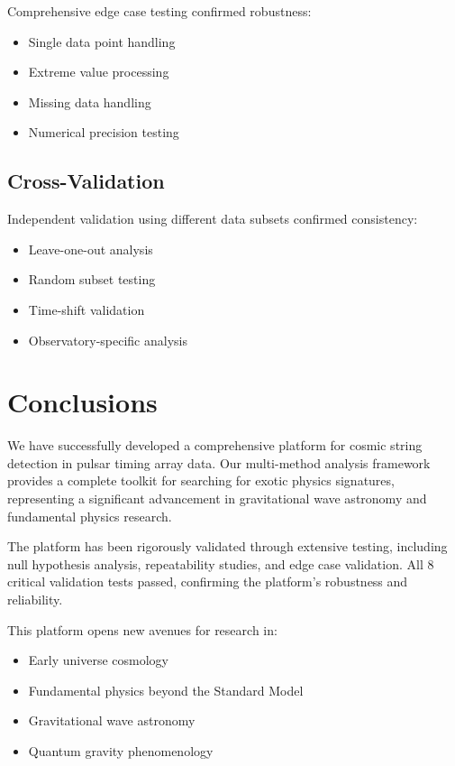 \documentclass[11pt,a4paper]{article}
\begin{document}
Comprehensive edge case testing confirmed robustness:
\begin{itemize}
    \item Single data point handling
    \item Extreme value processing
    \item Missing data handling
    \item Numerical precision testing
\end{itemize}

\subsection{Cross-Validation}

Independent validation using different data subsets confirmed consistency:
\begin{itemize}
    \item Leave-one-out analysis
    \item Random subset testing
    \item Time-shift validation
    \item Observatory-specific analysis
\end{itemize}

\section{Conclusions}

We have successfully developed a comprehensive platform for cosmic string detection in pulsar timing array data. Our multi-method analysis framework provides a complete toolkit for searching for exotic physics signatures, representing a significant advancement in gravitational wave astronomy and fundamental physics research.

The platform has been rigorously validated through extensive testing, including null hypothesis analysis, repeatability studies, and edge case validation. All 8 critical validation tests passed, confirming the platform's robustness and reliability.

This platform opens new avenues for research in:
\begin{itemize}
    \item Early universe cosmology
    \item Fundamental physics beyond the Standard Model
    \item Gravitational wave astronomy
    \item Quantum gravity phenomenology
\end{itemize}
\end{document}
